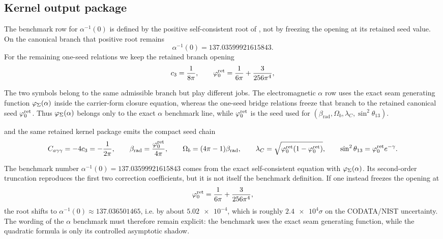 \subsection{Kernel output package}

The benchmark row for $\alpha^{-1}(0)$ is defined by the positive self-consistent root of , not by freezing the opening at its retained seed value. On the canonical branch that positive root remains
\[
\alpha^{-1}(0)=\num{137.03599921615843}.
\]
For the remaining one-seed relations we keep the retained branch opening
\begin{equation}
\label{eq:hard-kernel-values}
c_3=\frac{1}{8\pi},
\qquad
\varphi_0^{\mathrm{ret}}=\frac{1}{6\pi}+\frac{3}{256\pi^4},
\end{equation}
\begin{remark}
The two symbols belong to the same admissible branch but play different jobs. The electromagnetic $\alpha$ row uses the exact seam generating function $\varphi_{\Sigma}(\alpha)$ inside the carrier-form closure equation, whereas the one-seed bridge relations freeze that branch to the retained canonical seed $\varphi_0^{\mathrm{ret}}$. Thus $\varphi_{\Sigma}(\alpha)$ belongs only to the exact $\alpha$ benchmark line, while $\varphi_0^{\mathrm{ret}}$ is the seed used for $(\beta_{\mathrm{rad}},\Omega_b,\lambda_C,\sin^2\theta_{13})$.
\end{remark}
and the same retained kernel package emits the compact seed chain
\begin{equation}
\label{eq:kernel-benchmark-formulas}
C_{a\gamma\gamma}=-4c_3=-\frac{1}{2\pi},
\qquad
\beta_{\mathrm{rad}}=\frac{\varphi_0^{\mathrm{ret}}}{4\pi},
\qquad
\Omega_b=(4\pi-1)\beta_{\mathrm{rad}},
\qquad
\lambda_C=\sqrt{\varphi_0^{\mathrm{ret}}(1-\varphi_0^{\mathrm{ret}})},
\qquad
\sin^2\theta_{13}=\varphi_0^{\mathrm{ret}} e^{-\gamma}.
\end{equation}
\begin{remark}
The benchmark number $\alpha^{-1}(0)=\num{137.03599921615843}$ comes from the exact self-consistent equation with $\varphi_{\Sigma}(\alpha)$. Its second-order truncation reproduces the first two correction coefficients, but it is not itself the benchmark definition. If one instead freezes the opening at
\[
\varphi_0^{\mathrm{ret}}=\frac{1}{6\pi}+\frac{3}{256\pi^4},
\]
the root shifts to $\alpha^{-1}(0)\approx \num{137.036501465}$, i.e. by about $\num{5.02e-4}$, which is roughly $\num{2.4e4}\sigma$ on the CODATA/NIST uncertainty. The wording of the $\alpha$ benchmark must therefore remain explicit: the benchmark uses the exact seam generating function, while the quadratic formula is only its controlled asymptotic shadow.
\end{remark}
